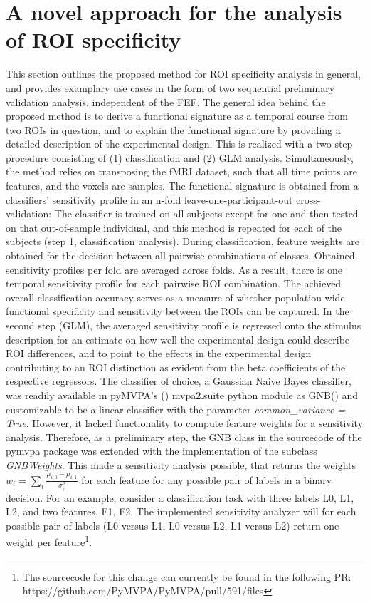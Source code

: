 \documentclass[a4paper, 12pt]{scrreprt}
\begin{document}
{\section{A novel approach for the analysis of ROI specificity}\label{newmethod}
This section outlines the proposed method for ROI specificity analysis in general, and provides examplary use cases in the form of two sequential preliminary validation analysis, independent of the FEF. \newline
The general idea behind the proposed method is to derive a functional signature as a temporal course from two ROIs in question, and to explain the functional signature by providing a detailed description of the experimental design. This is realized with a two step procedure consisting of (1) classification and (2) GLM analysis. 
Simultaneously, the method relies on transposing the fMRI dataset, such that all time points are features, and the voxels are samples.  \newline
The functional signature is obtained from a classifiers' sensitivity profile in an n-fold leave-one-participant-out cross-validation: The classifier is trained on all subjects except for one and then tested on that out-of-sample individual, and this method is repeated for each of the subjects (step 1, classification analysis). During classification, feature weights are obtained for the decision between all pairwise combinations of classes. Obtained sensitivity profiles per fold are averaged across folds. As a result, there is one temporal sensitivity profile for each pairwise ROI combination. The achieved overall classification accuracy serves as a measure of whether population wide functional specificity and sensitivity between the ROIs can be captured. In the second step (GLM), the averaged sensitivity profile is regressed onto the stimulus description for an estimate on how well the experimental design could describe ROI differences, and to point to the effects in the experimental design contributing to an ROI distinction as evident from the beta coefficients of the respective regressors. \newline
The classifier of choice, a Gaussian Naive Bayes classifier, was readily available in pyMVPA’s (\cite{hanke2009pymvpa}) mvpa2.suite python module as GNB() and customizable to be a linear classifier with the parameter \textit{common\_variance = True}. However, it lacked functionality to compute feature weights for a sensitivity analysis. Therefore, as a preliminary step, the GNB class in the sourcecode of the pymvpa package was extended with the implementation of the subclass \textit{GNBWeights}. This made a sensitivity analysis possible, that returns the weights $w_i = \sum_{i}\frac{\mu_{i, 0}-\mu_{i, 1}}{\sigma_{i}^{2}}$ for each feature for any possible pair of labels in a binary decision. For an example, consider a classification task with three labels L0, L1, L2, and two features, F1, F2. The implemented sensitivity analyzer will for each possible pair of labels (L0 versus L1, L0 versus L2, L1 versus L2) return one weight per feature\footnote{The sourcecode for this change can currently be found in the following PR: https://github.com/PyMVPA/PyMVPA/pull/591/files}. \newline
}
\end{document}
